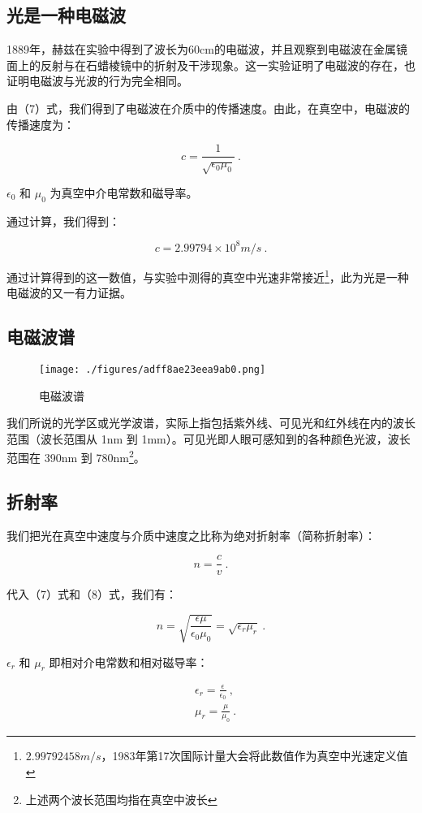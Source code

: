 \subsection{光是一种电磁波}

1889年，赫兹在实验中得到了波长为60cm的电磁波，并且观察到电磁波在金属镜面上的反射与在石蜡棱镜中的折射及干涉现象。这一实验证明了电磁波的存在，也证明电磁波与光波的行为完全相同。

由（7）式，我们得到了电磁波在介质中的传播速度。由此，在真空中，电磁波的传播速度为：

\begin{equation}
c = \frac{1}{\sqrt{\epsilon_0 \mu_0}} ~.
\end{equation}

$\epsilon_0$ 和 $\mu_0$ 为真空中介电常数和磁导率。

通过计算，我们得到：

\begin{equation}
c = 2.99794 \times 10^8 m/s~.
\end{equation}

通过计算得到的这一数值，与实验中测得的真空中光速非常接近\footnote{$2.99792458m/s$，1983年第17次国际计量大会将此数值作为真空中光速定义值}，此为光是一种电磁波的又一有力证据。

\subsection{电磁波谱}

\begin{figure}[ht]
\centering
\texttt{[image: ./figures/adff8ae23eea9ab0.png]}
\caption{电磁波谱} \label{fig_WaOp1_1}
\end{figure}

我们所说的光学区或光学波谱，实际上指包括紫外线、可见光和红外线在内的波长范围（波长范围从 1nm 到 1mm）。可见光即人眼可感知到的各种颜色光波，波长范围在 390nm 到 780nm\footnote{上述两个波长范围均指在真空中波长}。

\subsection{折射率}

我们把光在真空中速度与介质中速度之比称为绝对折射率（简称折射率）：

\begin{equation}
n = \frac{c}{v} ~.
\end{equation}

代入（7）式和（8）式，我们有：

\begin{equation}
n = \sqrt{\frac{\epsilon \mu}{\epsilon_0 \mu_0}} = \sqrt{\epsilon_r \mu_r} ~.
\end{equation}

$\epsilon_r$ 和 $\mu_r$ 即相对介电常数和相对磁导率：

\begin{equation}
\begin{aligned}
& \epsilon_r = \frac{\epsilon}{\epsilon_0} ~, \\
& \mu_r = \frac{\mu}{\mu_0} ~.
\end{aligned}
\end{equation}
